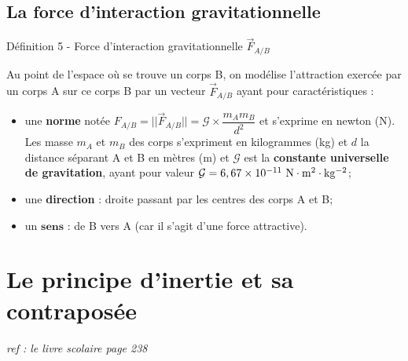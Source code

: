 \documentclass[french, a4paper, 12pt, twocolumn, landscape]{article}
\begin{document}
\clearpage
\subsection{La force d'interaction gravitationnelle}

\begin{definition}{Définition 5 - Force d'interaction gravitationnelle $\overrightarrow{F}_{A/B}$}

	Au point de l'espace où se trouve un corps B, on modélise l'attraction exercée par un corps A sur ce corps B par un vecteur $\overrightarrow{F}_{A/B}$ ayant pour caractéristiques :

	\begin{itemize}
		\item une \textbf{norme} notée $F_{A/B} = ||\overrightarrow{F}_{A/B}|| = \mathcal{G}\times \dfrac{m_A m_B}{d^2}$ et s'exprime en newton (N). Les masse $m_A$ et $m_B$ des corps s'expriment en kilogrammes (kg) et $d$ la distance séparant A et B en mètres (m) et $\mathcal{G}$ est la \textbf{constante universelle de gravitation}, ayant pour valeur $\mathcal{G}=6,67\times 10^{-11}~\rm N\cdot m^2\cdot kg^{-2}$;\medskip
		\item une \textbf{direction} : droite passant par les centres des corps A et B;\medskip
		\item  un $\textbf{sens}$ : de B vers A (car il s'agit d'une force attractive).
	\end{itemize}
\end{definition}

\vspace{2cm}
\section{Le principe d'inertie et sa contraposée}

\begin{center}
	\textit{ref : le livre scolaire page 238}
\end{center}
\end{document}
